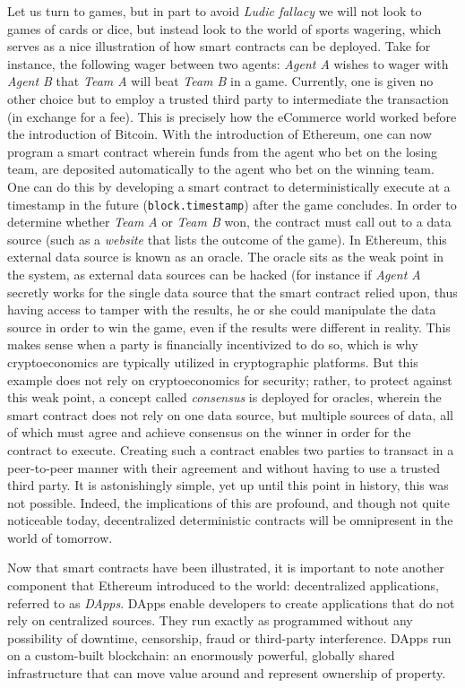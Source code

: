 \documentclass{article}
\begin{document}
Let us turn to games, but in part to avoid \textit{Ludic fallacy} we will not look to games of cards or dice, but instead look to the world of sports wagering, which serves as a nice illustration of how smart contracts can be deployed. Take for instance, the following wager between two agents: \textit{Agent A} wishes to wager with \textit{Agent B} that \textit{Team A} will beat \textit{Team B} in a game. Currently, one is given no other choice but to employ a trusted third party to intermediate the transaction (in exchange for a fee). This is precisely how the eCommerce world worked before the introduction of Bitcoin. With the introduction of Ethereum, one can now program a smart contract wherein funds from the agent who bet on the losing team, are deposited automatically to the agent who bet on the winning team. One can do this by developing a smart contract to deterministically execute at a timestamp in the future (\texttt{block.timestamp}) after the game concludes. In order to determine whether \textit{Team A} or \textit{Team B} won, the contract must call out to a data source (such as a \textit{website} that lists the outcome of the game). In Ethereum, this external data source is known as an \gls{oracle}. The oracle sits as the weak point in the system, as external data sources can be hacked (for instance if \textit{Agent A} secretly works for the single data source that the smart contract relied upon, thus having access to tamper with the results, he or she could manipulate the data source in order to win the game, even if the results were different in reality. This makes sense when a party is financially incentivized to do so, which is why cryptoeconomics are typically utilized in cryptographic platforms. But this example does not rely on cryptoeconomics for security; rather, to protect against this weak point, a concept called \textit{consensus} is deployed for oracles, wherein the smart contract does not rely on one data source, but multiple sources of data, all of which must agree and achieve consensus on the winner in order for the contract to execute. Creating such a contract enables two parties to transact in a peer-to-peer manner with their agreement and without having to use a trusted third party. It is astonishingly simple, yet up until this point in history, this was not possible. Indeed, the implications of this are profound, and though not quite noticeable today, decentralized deterministic contracts will be omnipresent in the world of tomorrow.

Now that smart contracts have been illustrated, it is important to note another component that Ethereum introduced to the world: decentralized applications, referred to as \textit{DApps}. DApps enable developers to create applications that do not rely on centralized sources. They run exactly as programmed without any possibility of downtime, censorship, fraud or third-party interference. DApps run on a custom-built blockchain: an enormously powerful, globally shared infrastructure that can move value around and represent ownership of property.
\end{document}
